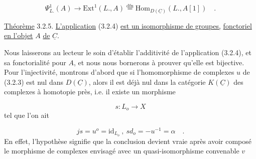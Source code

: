 \begin{equation}\tag{3.2.4}
\Psi^1_{L.} (A) \longrightarrow \mathrm{Ext}^1(L., A) \overset{\mathrm{dfn}}{=} \mathrm{Hom}_{D(\underline{C})}(L., A[1]) \quad .
\end{equation}


\underline{Théorème} 3.2.5. \underline{L'application} (3.2.4) \underline{est un isomorphisme de groupes,} \underline{fonctoriel en l'objet} $A$ \underline{de} $\underline{C}$.

Nous laisserons au lecteur le soin d'établir l'additivité de l'application (3.2.4), et sa fonctorialité pour $A$, et nous nous bornerons à prouver qu'elle est bijective. Pour l'injectivité, montrons d'abord que si l'homomorphisme de complexes $u$ de (3.2.3) est nul dans $D(\underline{C})$, alors il est déjà nul dans la catégorie $K(\underline{C})$ des complexes à homotopie près, i.e. il existe un morphisme

\begin{equation*}
s : L_o \longrightarrow X
\end{equation*}
tel que l'on ait

\begin{equation}\tag{3.2.5.1}
js = u^o = \mathrm{id}_{L_o} \ , \ sd_o = - u^{-1} = \alpha \quad .
\end{equation}
En effet, l'hypothèse signifie que la conclusion devient vraie après avoir composé le morphisme de complexes envisagé avec un quasi-isomorphisme convenable $v$

